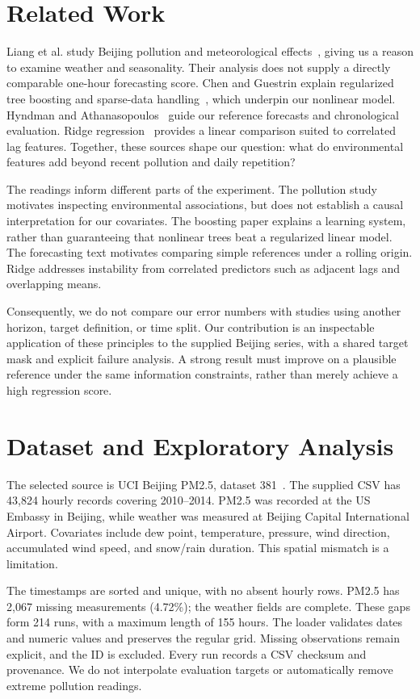 \documentclass[conference]{IEEEtran}
\begin{document}
\section{Related Work}
Liang et al. study Beijing pollution and meteorological effects~\cite{liang2015}, giving us a reason to examine weather and seasonality. Their analysis does not supply a directly comparable one-hour forecasting score. Chen and Guestrin explain regularized tree boosting and sparse-data handling~\cite{chen2016}, which underpin our nonlinear model. Hyndman and Athanasopoulos~\cite{hyndman2021} guide our reference forecasts and chronological evaluation. Ridge regression~\cite{hoerl1970} provides a linear comparison suited to correlated lag features. Together, these sources shape our question: what do environmental features add beyond recent pollution and daily repetition?

The readings inform different parts of the experiment. The pollution study motivates inspecting environmental associations, but does not establish a causal interpretation for our covariates. The boosting paper explains a learning system, rather than guaranteeing that nonlinear trees beat a regularized linear model. The forecasting text motivates comparing simple references under a rolling origin. Ridge addresses instability from correlated predictors such as adjacent lags and overlapping means.

Consequently, we do not compare our error numbers with studies using another horizon, target definition, or time split. Our contribution is an inspectable application of these principles to the supplied Beijing series, with a shared target mask and explicit failure analysis. A strong result must improve on a plausible reference under the same information constraints, rather than merely achieve a high regression score.

\section{Dataset and Exploratory Analysis}
The selected source is UCI Beijing PM2.5, dataset 381~\cite{uci381}. The supplied CSV has 43,824 hourly records covering 2010--2014. PM2.5 was recorded at the US Embassy in Beijing, while weather was measured at Beijing Capital International Airport. Covariates include dew point, temperature, pressure, wind direction, accumulated wind speed, and snow/rain duration. This spatial mismatch is a limitation.

The timestamps are sorted and unique, with no absent hourly rows. PM2.5 has 2,067 missing measurements (4.72\%); the weather fields are complete. These gaps form 214 runs, with a maximum length of 155 hours. The loader validates dates and numeric values and preserves the regular grid. Missing observations remain explicit, and the ID is excluded. Every run records a CSV checksum and provenance. We do not interpolate evaluation targets or automatically remove extreme pollution readings.
\end{document}

